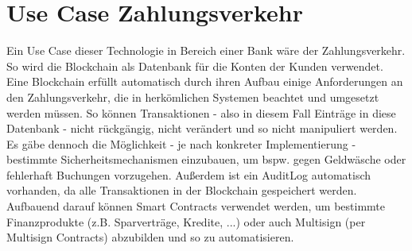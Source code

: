\noindent

\section{Use Case Zahlungsverkehr}




Ein Use Case dieser Technologie in Bereich einer Bank wäre der Zahlungsverkehr. 
So wird die Blockchain als Datenbank für die Konten der Kunden verwendet.
Eine Blockchain erfüllt automatisch durch ihren Aufbau einige Anforderungen an den Zahlungsverkehr, die in herkömlichen Systemen beachtet und umgesetzt werden müssen. 
So können Transaktionen - also in diesem Fall Einträge in diese Datenbank - nicht rückgängig, nicht verändert und so nicht manipuliert werden. 
Es gäbe dennoch die Möglichkeit - je nach konkreter Implementierung - bestimmte Sicherheitsmechanismen einzubauen, um bspw. gegen Geldwäsche oder fehlerhaft Buchungen vorzugehen. %
Außerdem ist ein AuditLog automatisch vorhanden, da alle Transaktionen in der Blockchain gespeichert werden.
Aufbauend darauf können Smart Contracts verwendet werden, um bestimmte Finanzprodukte (z.B. Sparverträge, Kredite, ...) oder auch Multisign (per Multisign Contracts) abzubilden und so zu automatisieren. %




